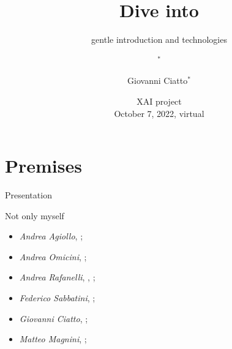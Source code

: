 \documentclass[presentation]{beamer}\mode<presentation>{\usetheme{AMSBolognaFC}}
\title[Dive into \skeski]
{Dive into \longskeski}
\subtitle[gentle introduction and technologies]
{gentle introduction and technologies}
\author[\sspeaker{Magnini et al.} ]
{\speaker{Matteo Magnini}$^{*}$ \and Giovanni Ciatto$^{*}$}
\institute[DISI, Univ.\ Bologna]
{
    $^{*}$\disi\\\unibo
    \\
    \{\speaker{matteo.magnini}, giovanni.ciatto\}@unibo.it %
}
\date[XAI project]{XAI project\\October 7, 2022, virtual}
\begin{document}

\frame{\titlepage}

%


\section{Premises}

\begin{frame}[c]{Presentation}
    
    \begin{block}{Not only myself}
        \begin{itemize}
            \item \emph{Andrea Agiollo}, \unibo{} \disi{};
            \item \emph{Andrea Omicini}, \unibo{} \disi{};
            \item \emph{Andrea Rafanelli}, \unipi{} \di{}, \uniaq{} \disim{};
            \item \emph{Federico Sabbatini}, \uniurb{} \dispea{};
            \item \emph{Giovanni Ciatto}, \unibo{} \disi{};
            \item \emph{Matteo Magnini}, \unibo{} \disi{};
        \end{itemize}
    \end{block}

\end{frame}
\end{document}

